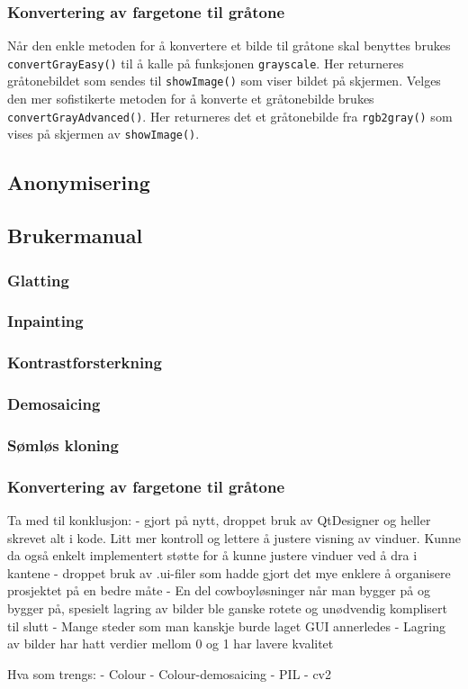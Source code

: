 \subsubsection{Konvertering av fargetone til gråtone}
Når den enkle metoden for å konvertere et bilde til gråtone skal benyttes brukes \texttt{convertGrayEasy()} til å kalle på funksjonen \texttt{grayscale}. Her returneres gråtonebildet som sendes til \texttt{showImage()} som viser bildet på skjermen. Velges den mer sofistikerte metoden for å konverte et gråtonebilde brukes \texttt{convertGrayAdvanced()}. Her returneres det et gråtonebilde fra \texttt{rgb2gray()} som vises på skjermen av \texttt{showImage()}.

\subsection{Anonymisering}


\subsection{Brukermanual}


\subsubsection{Glatting}


\subsubsection{Inpainting}


\subsubsection{Kontrastforsterkning}


\subsubsection{Demosaicing}


\subsubsection{Sømløs kloning}


\subsubsection{Konvertering av fargetone til gråtone}


Ta med til konklusjon: 
- gjort på nytt, droppet bruk av QtDesigner og heller skrevet alt i kode. Litt mer kontroll og lettere å justere visning av vinduer. Kunne da også enkelt implementert støtte for å kunne justere vinduer ved å dra i kantene
- droppet bruk av .ui-filer som hadde gjort det mye enklere å organisere prosjektet på en bedre måte
- En del cowboyløsninger når man bygger på og bygger på, spesielt lagring av bilder ble ganske rotete og unødvendig komplisert til slutt
- Mange steder som man kanskje burde laget GUI annerledes
- Lagring av bilder har hatt verdier mellom 0 og 1 har lavere kvalitet

Hva som trengs:
- Colour
- Colour-demosaicing
- PIL
- cv2
